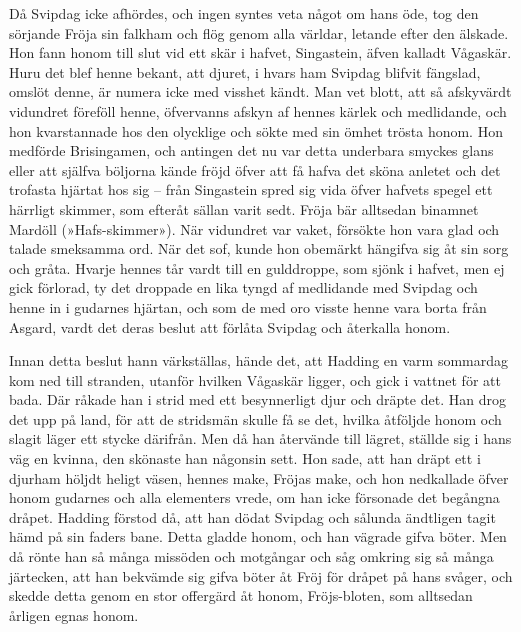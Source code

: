Då Svipdag icke afhördes, och ingen syntes veta något om hans öde, tog
den sörjande Fröja sin falkham och flög genom alla världar, letande
efter den älskade. Hon fann honom till slut vid ett skär i hafvet,
Singastein, äfven kalladt Vågaskär. Huru det blef henne bekant, att
djuret, i hvars ham Svipdag blifvit fängslad, omslöt denne, är numera
icke med visshet kändt. Man vet blott, att så afskyvärdt vidundret
föreföll henne, öfvervanns afskyn af hennes kärlek och medlidande, och
hon kvarstannade hos den olycklige och sökte med sin ömhet trösta honom.
Hon medförde Brisingamen, och antingen det nu var detta underbara
smyckes glans eller att själfva böljorna kände fröjd öfver att få hafva
det sköna anletet och det trofasta hjärtat hos sig -- från Singastein
spred sig vida öfver hafvets spegel ett härrligt skimmer, som efteråt
sällan varit sedt. Fröja bär alltsedan binamnet Mardöll
(»Hafs-skimmer»). När vidundret var vaket, försökte hon vara glad och
talade smeksamma ord. När det sof,
\protect\hypertarget{lb1625905.xhtmlux5cux23start168}{}{}\protect\hypertarget{lb1625905.xhtmlux5cux23start168-a}{}{}\protect\hypertarget{lb1625905.xhtmlux5cux23start168-b}{}{}\protect\hypertarget{lb1625905.xhtmlux5cux23start168-c}{}{}\protect\hypertarget{lb1625905.xhtmlux5cux23start168-d}{}{}
kunde hon obemärkt hängifva sig åt sin sorg och gråta. Hvarje hennes tår
vardt till en gulddroppe, som sjönk i hafvet, men ej gick förlorad, ty
det droppade en lika tyngd af medlidande med Svipdag och henne in i
gudarnes hjärtan, och som de med oro visste henne vara borta från
Asgard, vardt det deras beslut att förlåta Svipdag och återkalla honom.

Innan detta beslut hann värkställas, hände det, att Hadding en varm
sommardag kom ned till stranden, utanför hvilken Vågaskär ligger, och
gick i vattnet för att bada. Där råkade han i strid med ett besynnerligt
djur och dräpte det. Han drog det upp på land, för att de stridsmän
skulle få se det, hvilka åtföljde honom och slagit läger ett stycke
därifrån. Men då han återvände till lägret, ställde sig i hans väg en
kvinna, den skönaste han någonsin sett. Hon sade, att han dräpt ett i
djurham höljdt heligt väsen, hennes make, Fröjas make, och hon
nedkallade öfver honom gudarnes och alla elementers vrede, om han icke
försonade det begångna dråpet. Hadding förstod då, att han dödat Svipdag
och sålunda ändtligen tagit hämd på sin faders bane. Detta gladde honom,
och han vägrade gifva böter. Men då rönte han så många missöden och
motgångar och såg omkring sig så många järtecken, att han bekvämde sig
gifva böter åt Fröj för dråpet på hans svåger, och skedde detta genom en
stor offergärd åt honom, Fröjs-bloten, som alltsedan årligen egnas
honom.

